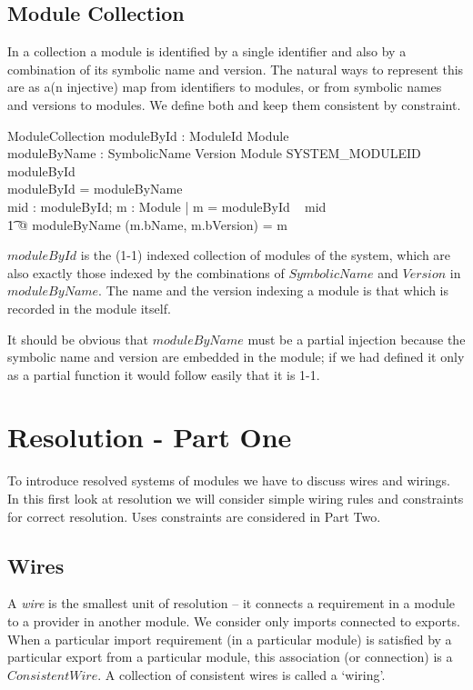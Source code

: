 \documentclass[a4paper,12pt]{article}
\begin{document}
\subsection{Module Collection}
In a collection a module is identified by a single identifier and also by a combination of its symbolic name and version. The natural ways to represent this are as a(n injective) map from identifiers to modules, or from symbolic names and versions to modules. We define both and keep them consistent by constraint.
\begin{schema}{ModuleCollection}
	moduleById : ModuleId \pinj Module \\
	moduleByName : SymbolicName \cross Version \pinj Module
\where
	SYSTEM\_MODULEID \in \dom moduleById \\
	\ran moduleById = \ran moduleByName \\
	\forall mid :  \dom moduleById; m : Module |  m = moduleById ~ mid \\
	\t1      @ moduleByName (m.bName, m.bVersion) = m \\
\end{schema}
$moduleById$ is the (1-1) indexed collection of modules of the system, which are also exactly those indexed by the combinations of $SymbolicName$ and $Version$ in $moduleByName$. The name and the version indexing a module is that which is recorded in the module itself.

It should be obvious that $moduleByName$ must be a partial injection because the symbolic name and version are embedded in the module; if we had defined it only as a partial function it would follow easily that it is 1-1.
\clearpage
\section{Resolution - Part One}
\label{cha:resolutionI}
To introduce resolved systems of modules we have to discuss wires and wirings. In this first look at resolution we will consider simple wiring rules and constraints for correct resolution. Uses constraints are considered in Part Two.

\subsection{Wires}
A {\it wire} is the smallest unit of resolution -- it connects a requirement in a module to a provider in another module. We consider only imports connected to exports.  When a particular import requirement (in a particular module) is satisfied by a particular export from a particular module, this association (or connection) is a $ConsistentWire$. A collection of consistent wires is called a `wiring'.
\end{document}
